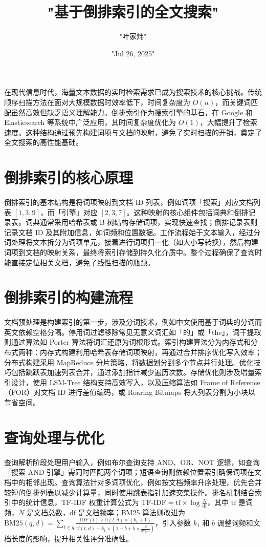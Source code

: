 \title{"基于倒排索引的全文搜索"}
\author{"叶家炜"}
\date{"Jul 26, 2025"}
\maketitle
在现代信息时代，海量文本数据的实时检索需求已成为搜索技术的核心挑战。传统顺序扫描方法在面对大规模数据时效率低下，时间复杂度为 $O(n)$，而关键词匹配虽然高效但缺乏语义理解能力。倒排索引作为搜索引擎的基石，在 Google 和 Elasticsearch 等系统中广泛应用，其时间复杂度优化为 $O(1)$，大幅提升了检索速度。这种结构通过预先构建词项与文档的映射，避免了实时扫描的开销，奠定了全文搜索的高性能基础。\par
\chapter{倒排索引的核心原理}
倒排索引的基本结构是将词项映射到文档 ID 列表，例如词项「搜索」对应文档列表 $[1, 3, 9]$，而「引擎」对应 $[2, 3, 7]$。这种映射的核心组件包括词典和倒排记录表。词典通常采用哈希表或 B 树结构存储词项，实现快速查找；倒排记录表则记录文档 ID 及其附加信息，如词频和位置数据。工作流程始于文本输入，经过分词处理将文本拆分为词项单元，接着进行词项归一化（如大小写转换），然后构建词项到文档的映射关系，最终将索引存储到持久化介质中。整个过程确保了查询时能直接定位相关文档，避免了线性扫描的瓶颈。\par
\chapter{倒排索引的构建流程}
文档预处理是构建索引的第一步，涉及分词技术，例如中文使用基于词典的分词而英文依赖空格分隔。停用词过滤移除常见无意义词汇如「的」或「the」，词干提取则通过算法如 Porter 算法将词汇还原为词根形式。索引构建算法分为内存式和分布式两种：内存式构建利用哈希表存储词项映射，再通过合并排序优化写入效率；分布式构建采用 MapReduce 分片策略，将数据划分到多个节点并行处理。优化技巧包括跳跃表加速列表合并，通过添加指针减少遍历次数。存储优化则涉及增量索引设计，使用 LSM-Tree 结构支持高效写入，以及压缩算法如 Frame of Reference（FOR）对文档 ID 进行差值编码，或 Roaring Bitmaps 将大列表分割为小块以节省空间。\par
\chapter{查询处理与优化}
查询解析阶段处理用户输入，例如布尔查询支持 AND、OR、NOT 逻辑，如查询「搜索 AND 引擎」需同时匹配两个词项；短语查询则依赖位置索引确保词项在文档中的相邻出现。查询算法针对多词项优化，例如按文档频率升序处理，优先合并较短的倒排列表以减少计算量，同时使用跳表指针加速交集操作。排名机制结合索引中的统计信息，TF-IDF 权重计算公式为 $\text{TF-IDF} = \text{tf} \times \log \frac{N}{\text{df}}$，其中 $\text{tf}$ 是词频，$N$ 是文档总数，$\text{df}$ 是文档频率；BM25 算法则改进为 $\text{BM25}(q,d) = \sum_{t \in q} \frac{\text{IDF}(t) \times \text{tf}(t,d) \times (k_1 + 1)}{\text{tf}(t,d) + k_1 \times (1 - b + b \times \frac{|d|}{\text{avgdl}})}$，引入参数 $k_1$ 和 $b$ 调整词频和文档长度的影响，提升相关性评分准确性。\par
